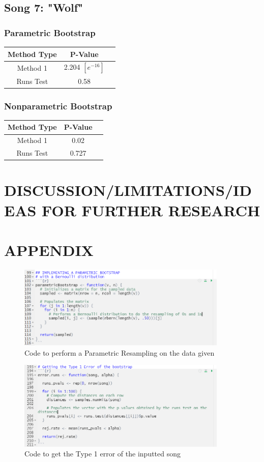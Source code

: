 \documentclass[12pt, letterpaper]{article}
\begin{document}
\subsection{Song 7: "Wolf"}
\subsubsection{Parametric Bootstrap}
\begin{tabular}{|c|c|c|}
\hline
\textbf{Method Type} & P-Value  \\
\hline
Method 1 & 2.204 $[e^{-16}]$ \\
\hline
Runs Test & 0.58 \\ 
\hline
\end{tabular}

\subsubsection{Nonparametric Bootstrap}
\begin{tabular}{|c|c|c|}
\hline
\textbf{Method Type} & P-Value \\
\hline
Method 1 & 0.02  \\
\hline
Runs Test & 0.727 \\ 
\hline
\end{tabular}


\section{DISCUSSION/LIMITATIONS/IDEAS FOR FURTHER RESEARCH}

\section{APPENDIX}

\begin{figure}[!hb]
\centering
\includegraphics[width=10cm]{ParametricBootstrapCode.png}
\caption{Code to perform a Parametric Resampling on the data given}
\label{fig: Parametric Bootstrap Code}
\end{figure}

\begin{figure}[!hb]
\centering
\includegraphics[width=10cm]{Type1ErrCode.png}
\caption{Code to get the Type 1 error of the inputted song}
\label{fig: Type 1 Error Code}
\end{figure}
\end{document}

